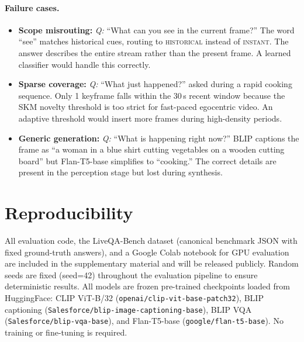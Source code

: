 \paragraph{Failure cases.}
\begin{itemize}[itemsep=4pt,leftmargin=*]
  \item \textbf{Scope misrouting:} \emph{Q:} ``What can you see in the current frame?'' The word ``see'' matches historical cues, routing to \textsc{historical} instead of \textsc{instant}. The answer describes the entire stream rather than the present frame. A learned classifier would handle this correctly.

  \item \textbf{Sparse coverage:} \emph{Q:} ``What just happened?'' asked during a rapid cooking sequence. Only 1 keyframe falls within the 30\,s recent window because the SKM novelty threshold is too strict for fast-paced egocentric video. An adaptive threshold would insert more frames during high-density periods.

  \item \textbf{Generic generation:} \emph{Q:} ``What is happening right now?'' BLIP captions the frame as ``a woman in a blue shirt cutting vegetables on a wooden cutting board'' but Flan-T5-base simplifies to ``cooking.'' The correct details are present in the perception stage but lost during synthesis.
\end{itemize}

\section{Reproducibility}
\label{sec:suppl_repro}

All evaluation code, the LiveQA-Bench dataset (canonical benchmark JSON with fixed ground-truth answers), and a Google Colab notebook for GPU evaluation are included in the supplementary material and will be released publicly.
Random seeds are fixed (seed=42) throughout the evaluation pipeline to ensure deterministic results.
All models are frozen pre-trained checkpoints loaded from HuggingFace: CLIP ViT-B/32 (\texttt{openai/clip-vit-base-patch32}), BLIP captioning (\texttt{Salesforce/blip-image-captioning-base}), BLIP VQA (\texttt{Salesforce/blip-vqa-base}), and Flan-T5-base (\texttt{google/flan-t5-base}).
No training or fine-tuning is required.
